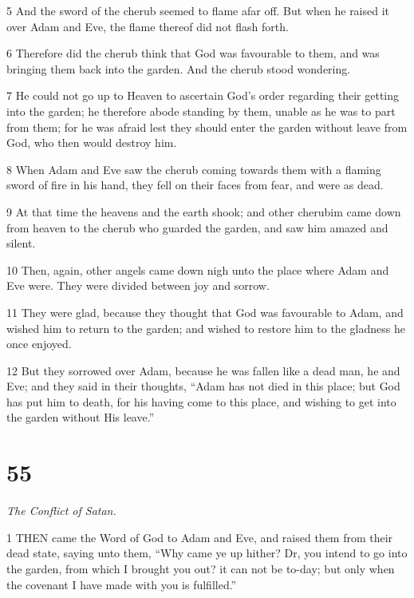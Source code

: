 \par 5 And the sword of the cherub seemed to flame afar off. But when he raised it over Adam and Eve, the flame thereof did not flash forth.

\par 6 Therefore did the cherub think that God was favourable to them, and was bringing them back into the garden. And the cherub stood wondering.

\par 7 He could not go up to Heaven to ascertain God's order regarding their getting into the garden; he therefore abode standing by them, unable as he was to part from them; for he was afraid lest they should enter the garden without leave from God, who then would destroy him.

\par 8 When Adam and Eve saw the cherub coming towards them with a flaming sword of fire in his hand, they fell on their faces from fear, and were as dead.

\par 9 At that time the heavens and the earth shook; and other cherubim came down from heaven to the cherub who guarded the garden, and saw him amazed and silent.

\par 10 Then, again, other angels came down nigh unto the place where Adam and Eve were. They were divided between joy and sorrow.

\par 11 They were glad, because they thought that God was favourable to Adam, and wished him to return to the garden; and wished to restore him to the gladness he once enjoyed.

\par 12 But they sorrowed over Adam, because he was fallen like a dead man, he and Eve; and they said in their thoughts, “Adam has not died in this place; but God has put him to death, for his having come to this place, and wishing to get into the garden without His leave.”



\chapter{55}

\par \textit{The Conflict of Satan.}

\par 1 THEN came the Word of God to Adam and Eve, and raised them from their dead state, saying unto them, “Why came ye up hither? Dr, you intend to go into the garden, from which I brought you out? it can not be to-day; but only when the covenant I have made with you is fulfilled.”

